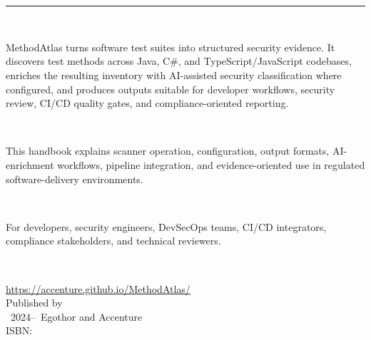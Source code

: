 \thispagestyle{empty}
\pagecolor{MA@navy}
\color{white}

\vspace*{2.7cm}

\begin{center}
  {}\\[0.65em]

  {\large\itshape \MethodAtlasTagline}\\[2.8em]

  {\color{MA@teal}\rule{0.42\textwidth}{0.9pt}}\\[2.0em]

  \parbox{0.73\textwidth}{\small\centering
    MethodAtlas turns software test suites into structured security evidence.
    It discovers test methods across Java, C\#, and TypeScript/JavaScript
    codebases, enriches the resulting inventory with AI-assisted security
    classification where configured, and produces outputs suitable for
    developer workflows, security review, CI/CD quality gates, and
    compliance-oriented reporting.
  }\\[1.7em]

  \parbox{0.73\textwidth}{\small\centering
    This handbook explains scanner operation, configuration, output formats,
    AI-enrichment workflows, pipeline integration, and evidence-oriented use in
    regulated software-delivery environments.
  }\\[2.0em]

  \parbox{0.68\textwidth}{\footnotesize\centering
    For developers, security engineers, DevSecOps teams, CI/CD integrators,
    compliance stakeholders, and technical reviewers.
  }\\[2.1em]

  {\small\bfseries \MethodAtlasAuthor}
\end{center}

\vfill

\begin{center}
  {\small\url{https://accenture.github.io/MethodAtlas/}}\\[0.85em]
  {\footnotesize Published by \MethodAtlasPublisher}\\[0.35em]
  {\footnotesize\textcopyright\ 2024--\the\year\ Egothor and Accenture}\\[0.45em]
  {\footnotesize ISBN:\enspace \MethodAtlasISBN}
\end{center}

\vspace{1.35cm}
